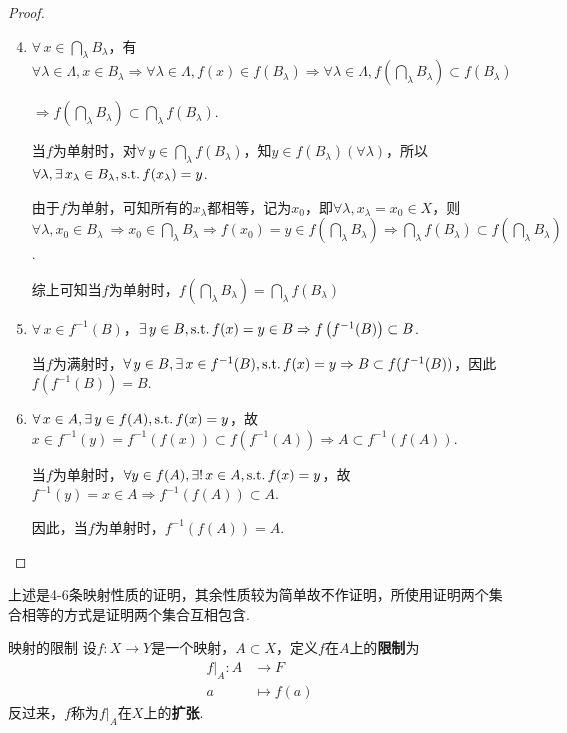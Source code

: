 \begin{proof}
    \begin{enumerate}
        \setcounter{enumi}{3}
        \item $\forall\, x\in \bigcap_{\lambda}{B_\lambda}$，有$\forall \lambda\in\Lambda,x\in B_{\lambda} \Rightarrow \forall \lambda\in\Lambda,f(x)\in f \left(B_\lambda\right) \Rightarrow \forall\lambda\in\Lambda,f\left(\bigcap_{\lambda}{B_\lambda}\right)\subset f(B_\lambda)$\par
        $ \Rightarrow f\left(\bigcap_{\lambda}{B_\lambda}\right)\subset\bigcap_{\lambda}{f(B_\lambda)}$.\par
        当$f$为单射时，对$\forall\, y\in \bigcap_{\lambda}{f(B_\lambda)}$，知$y\in f(B_\lambda)(\forall \lambda)$，所以$\forall \lambda,\exists\, x_\lambda\in B_\lambda,\operatorname{\text{s.t.}} f(x_\lambda)=y$.\par
        由于$f$为单射，可知所有的$x_\lambda$都相等，记为$x_0$，即$\forall \lambda,x_\lambda=x_0 \in X$，则$\forall \lambda,x_0\in B_\lambda\ \Rightarrow x_0\in\bigcap_{\lambda}{B_\lambda} \Rightarrow f(x_0)=y\in f\left(\bigcap_\lambda{B_\lambda}\right) \Rightarrow \bigcap_{\lambda}{f(B_\lambda)}\subset f\left(\bigcap_\lambda{B_\lambda}\right)$.\par
        综上可知当$f$为单射时，$f\left(\bigcap_{\lambda}{B_\lambda}\right) = \bigcap_{\lambda}{f(B_\lambda)}$
        \item $\forall\, x\in f^{-1}(B)$，$\exists\, y\in B,\operatorname{\text{s.t.}} f(x)=y\in B \Rightarrow f\left(f^{-1}(B)\right)\subset B$.\par
        当$f$为满射时，$\forall\, y\in B,\exists\, x\in f^{-1}(B),\operatorname{\text{s.t.}} f(x)=y \Rightarrow B \subset f(f^{-1}(B))$，因此$f\left(f^{-1}(B)\right)= B$.
        \item $\forall\, x\in A,\exists\, y\in f(A),\operatorname{\text{s.t.}} f(x)=y$，故$x\in f^{-1}(y) = f^{-1}(f(x)) \subset f(f^{-1}(A)) \Rightarrow A\subset f^{-1}(f(A))$.\par
        当$f$为单射时，$\forall y\in f(A),\exists!\, x\in A,\operatorname{\text{s.t.}} f(x)=y$，故$f^{-1}(y)=x\in A \Rightarrow f^{-1}(f(A))\subset A$.\par
        因此，当$f$为单射时，$f^{-1}(f(A))=A$.
    \end{enumerate}
\end{proof}

上述是4-6条映射性质的证明，其余性质较为简单故不作证明，所使用证明两个集合相等的方式是证明两个集合互相包含.


\begin{definition}{映射的限制}
    设$f:X\to Y$是一个映射，$A\subset X$，定义$f$在$A$上的\textbf{限制}为
    \begin{align*}
        f|_A :A &\to F \\
        a &\mapsto f(a)
    \end{align*}
    反过来，$f$称为$f|_A$在$X$上的\textbf{扩张}.
\end{definition}

